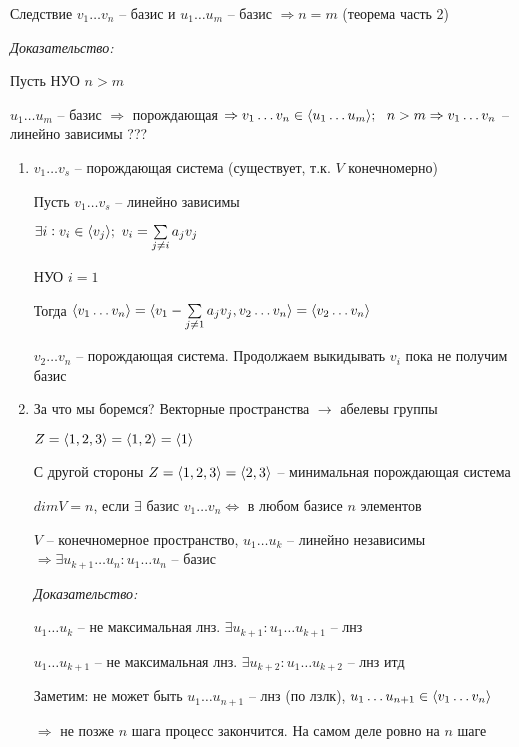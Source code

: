 \documentclass[12pt]{article}
\begin{document}
\begin{theo}{Следствие}
    $v_1 \ldots v_n$ -- базис и $u_1 \ldots u_m$ -- базис $\Rightarrow n = m$ (теорема часть 2)
\end{theo}

\textit{Доказательство:}

Пусть НУО $n > m$

$u_1 \ldots u_m$ -- базис $\Rightarrow$ порождающая $\Rightarrow v_1 \ldots v_n \in \langle u_1 \ldots u_m \rangle;\ \ n > m \Rightarrow v_1 \ldots v_n$ -- линейно зависимы ???

\begin{enumerate}
    \item $v_1 \ldots v_s$ -- порождающая система (существует, т.к. $V$ конечномерно)
    
    Пусть $v_1 \ldots v_s$ -- линейно зависимы

    $\exists i : v_i \in \langle v_j \rangle;\ v_i = \sum\limits_{j \neq i} a_jv_j$

    НУО $i = 1$

    Тогда $\langle v_1 \ldots v_n \rangle = \langle v_1 - \sum\limits_{j \neq 1} a_jv_j, v_2 \ldots v_n \rangle = \langle v_2 \ldots v_n \rangle$

    $v_2 \ldots v_n$ -- порождающая система. Продолжаем выкидывать $v_i$ пока не получим базис

    \item 
    
    \begin{Example}{За что мы боремся?}
        Векторные пространства $\rightarrow$ абелевы группы

        $Z = \langle 1, 2, 3 \rangle = \langle 1, 2 \rangle = \langle 1 \rangle$

        С другой стороны $Z = \langle 1, 2, 3 \rangle = \langle 2, 3 \rangle$ -- минимальная порождающая система
    \end{Example}
    
    $dimV = n$, если $\exists$ базис $v_1 \ldots v_n \Leftrightarrow$ в любом базисе $n$ элементов

    \begin{lem}{}
        $V$ -- конечномерное пространство, $u_1 \ldots u_k$ -- линейно независимы $\Rightarrow \exists u_{k + 1} \ldots u_n : u_1 \ldots u_n$ -- базис
    \end{lem}

    \textit{Доказательство:}

    $u_1 \ldots u_k$ -- не максимальная лнз. $\exists u_{k + 1} : u_1 \ldots u_{k + 1}$ -- лнз

    $u_1 \ldots u_{k + 1}$ -- не максимальная лнз. $\exists u_{k + 2} : u_1 \ldots u_{k + 2}$ -- лнз итд

    Заметим: не может быть $u_1 \ldots u_{n + 1}$ -- лнз (по лзлк), $u_1 \ldots u_{n + 1} \in \langle v_1 \ldots v_n \rangle$

    $\Rightarrow$ не позже $n$ шага процесс закончится. На самом деле ровно на $n$ шаге
\end{enumerate}
\end{document}
